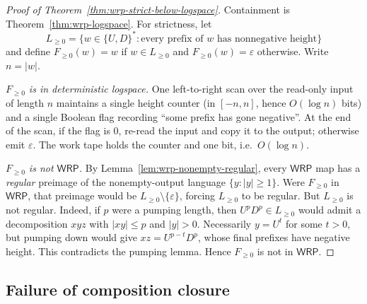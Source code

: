 \documentclass[11pt]{article}
\theoremstyle{definition}
\newcommand{\WRP}{\mathsf{WRP}}
\begin{document}
\begin{proof}[Proof of Theorem~\ref{thm:wrp-strict-below-logspace}]
Containment is Theorem~\ref{thm:wrp-logspace}.  For strictness, let
\[
   L_{\ge 0}=\{w\in\{U,D\}^*:\text{every prefix of }w\text{ has nonnegative height}\}
\]
and define $F_{\ge 0}(w)=w$ if $w\in L_{\ge 0}$ and
$F_{\ge 0}(w)=\varepsilon$ otherwise.
Write $n=|w|$.

\vspace{0.5em}
\noindent\emph{$F_{\ge 0}$ is in deterministic logspace.}  One left-to-right scan
over the read-only input of length $n$ maintains a single height counter
(in $[-n,n]$, hence $O(\log n)$ bits) and a single Boolean flag
recording ``some prefix has gone negative''.  At the end of the scan, if the
flag is $0$, re-read the input and copy it to the output;
otherwise emit $\varepsilon$.  The work tape holds the counter and one bit,
i.e.\ $O(\log n)$.

\vspace{0.5em}
\noindent\emph{$F_{\ge 0}$ is not $\WRP$.}  By
Lemma~\ref{lem:wrp-nonempty-regular}, every $\WRP$ map has a
\emph{regular} preimage of the nonempty-output language $\{y:|y|\ge 1\}$.
Were $F_{\ge 0}$ in $\WRP$, that preimage would be
$L_{\ge 0}\setminus\{\varepsilon\}$, forcing $L_{\ge 0}$ to be regular.  But
$L_{\ge 0}$ is not regular.  Indeed, if $p$ were a pumping length, then
$U^pD^p\in L_{\ge 0}$ would admit a decomposition $xyz$ with
$|xy|\le p$ and $|y|>0$.  Necessarily $y=U^t$ for some $t>0$, but pumping
down would give $xz=U^{p-t}D^p$, whose final prefixes have negative height.
This contradicts the pumping lemma.  Hence $F_{\ge 0}$ is not in $\WRP$.
\end{proof}

\subsection{Failure of composition closure}
\end{document}
